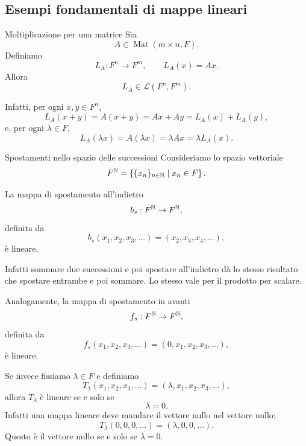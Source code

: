 \documentclass[a4paper]{article}
\begin{document}
\subsection{Esempi fondamentali di mappe lineari}

\begin{snippetexample}{Moltiplicazione per una matrice}
    Sia
    \[
        A\in\operatorname{Mat}(m\times n,F).
    \]
    Definiamo
    \[
        L_A:F^n\to F^m,
        \qquad
        L_A(x)=Ax.
    \]
    Allora
    \[
        L_A\in\mathcal{L}(F^n,F^m).
    \]

    Infatti, per ogni \(x,y\in F^n\),
    \[
        L_A(x+y)=A(x+y)=Ax+Ay=L_A(x)+L_A(y),
    \]
    e, per ogni \(\lambda\in F\),
    \[
        L_A(\lambda x)=A(\lambda x)=\lambda Ax=\lambda L_A(x).
    \]
\end{snippetexample}

\begin{snippetexample}{Spostamenti nello spazio delle successioni}
    Consideriamo lo spazio vettoriale
    \[
        F^{\mathbb{N}}
        =
        \left\{
            \{x_n\}_{n\in\mathbb{N}}
            \mid x_n\in F
        \right\}.
    \]

    La mappa di spostamento all'indietro
    \[
        b_s:F^{\mathbb{N}}\to F^{\mathbb{N}},
    \]
    definita da
    \[
        b_s(x_1,x_2,x_3,\ldots)=(x_2,x_3,x_4,\ldots),
    \]
    è lineare.

    Infatti sommare due successioni e poi spostare all'indietro dà lo stesso risultato che spostare entrambe e poi sommare. Lo stesso vale per il prodotto per scalare.

    Analogamente, la mappa di spostamento in avanti
    \[
        f_s:F^{\mathbb{N}}\to F^{\mathbb{N}},
    \]
    definita da
    \[
        f_s(x_1,x_2,x_3,\ldots)=(0,x_1,x_2,x_3,\ldots),
    \]
    è lineare.
\end{snippetexample}

\begin{snippetremark}{}
    Se invece fissiamo \(\lambda\in F\) e definiamo
    \[
        T_\lambda(x_1,x_2,x_3,\ldots)
        =
        (\lambda,x_1,x_2,x_3,\ldots),
    \]
    allora \(T_\lambda\) è lineare se e solo se
    \[
        \lambda=0.
    \]
    Infatti una mappa lineare deve mandare il vettore nullo nel vettore nullo:
    \[
        T_\lambda(0,0,0,\ldots)=(\lambda,0,0,\ldots).
    \]
    Questo è il vettore nullo se e solo se \(\lambda=0\).
\end{snippetremark}
\end{document}
